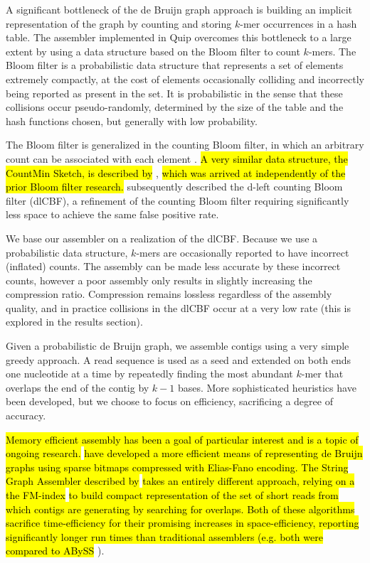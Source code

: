 \documentclass[a4,center,fleqn]{NAR}
\begin{document}
A significant bottleneck of the de Bruijn graph approach is building an
implicit representation of the graph by counting and storing $k$-mer
occurrences in a hash table. The assembler implemented in Quip 
overcomes this bottleneck to a large extent by using a data structure based on
the Bloom filter to count $k$-mers. The Bloom filter \citep{Bloom1970} is a
probabilistic data structure that represents a set of elements extremely
compactly, at the cost of elements occasionally colliding and incorrectly
being reported as present in the set. It is probabilistic in the sense that
these collisions occur pseudo-randomly, determined by the size of the table
and the hash functions chosen, but generally with low probability.

The Bloom filter is generalized in the counting Bloom filter, in which an
arbitrary count can be associated with each element \citep{Fan2000}. \hl{A very
similar data structure, the CountMin Sketch, is described by}
\citet{Cormode2005}, \hl{which was arrived at independently of the prior Bloom
filter research.}  \citet{Bonomi2006} subsequently described the d-left counting
Bloom filter (dlCBF), a refinement of the counting Bloom filter requiring
significantly less space to achieve the same false positive rate.

We base our assembler on a realization of the dlCBF. Because we use a
probabilistic data structure, $k$-mers are occasionally reported to have
incorrect (inflated) counts. The assembly can be made less accurate by these
incorrect counts, however a poor assembly only results in slightly increasing
the compression ratio. Compression remains lossless regardless of the assembly
quality, and in practice collisions in the dlCBF occur at a very low rate
(this is explored in the results section).

Given a probabilistic de Bruijn graph, we assemble contigs using a very simple
greedy approach. A read sequence is used as a seed and extended on both ends
one nucleotide at a time by repeatedly finding the most abundant $k$-mer that
overlaps the end of the contig by $k-1$ bases. More sophisticated heuristics
have been developed, but we choose to focus on efficiency, sacrificing a
degree of accuracy.

\hl{Memory efficient assembly has been a goal of particular interest and is a topic
of ongoing research.} \citet{Conway2011} \hl{have developed a more efficient means of
representing de Bruijn graphs using sparse bitmaps compressed with Elias-Fano
encoding. The String Graph Assembler described by} \citet{Simpson2012} \hl{takes an
entirely different approach, relying on a the FM-index} \citep{Ferragina2000}
\hl{to
build compact representation of the set of short reads from which contigs are
generating by searching for overlaps.  Both of these algorithms sacrifice
time-efficiency for their promising increases in space-efficiency, reporting
significantly longer run times than traditional assemblers (e.g. both were
compared to ABySS} \citep{Simpson2011}).
\end{document}

